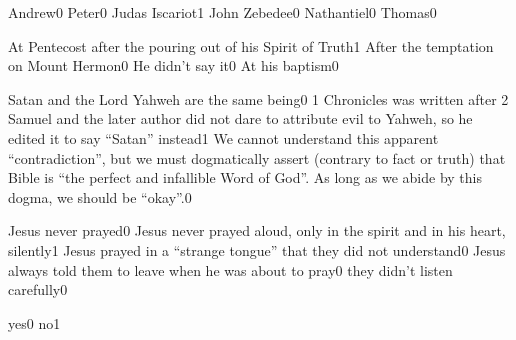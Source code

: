 
{Andrew}{0}
{Peter}{0}
{Judas Iscariot}{1}
{John Zebedee}{0}
{Nathantiel}{0}
{Thomas}{0}
\qstop


{At Pentecost after the pouring out of his Spirit of Truth}{1}
{After the temptation on Mount Hermon}{0}
{He didn't say it}{0}
{At his baptism}{0}
\qstop


{Satan and the Lord Yahweh are the same being}{0}
{1 Chronicles was written after 2 Samuel and the later author did not dare to attribute evil to Yahweh, so he edited it to say ``Satan'' instead}{1}
{We cannot understand this apparent ``contradiction'', but we must dogmatically assert (contrary to fact or truth) that Bible is ``the perfect and infallible Word of God''. As long as we abide by this dogma, we should be ``okay''.}{0}
\qstop



{Jesus never prayed}{0}
{Jesus never prayed aloud, only in the spirit and in his heart, silently}{1}
{Jesus prayed in a ``strange tongue'' that they did not understand}{0}
{Jesus always told them to leave when he was about to pray}{0}
{they didn't listen carefully}{0}
\qstop


{yes}{0}
{no}{1}
\qstop






